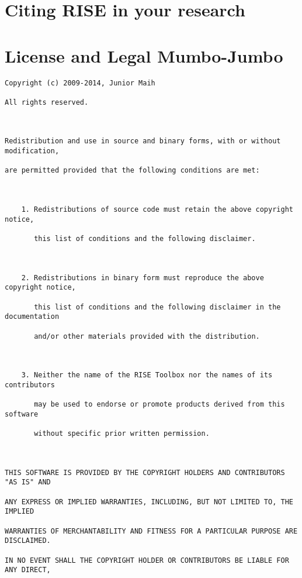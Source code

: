 \documentclass[letterpaper,10pt,english]{sphinxmanual}
\begin{document}
\section{Citing RISE in your research}
\label{intro_folder/citing_rise:citing-rise-in-your-research}\label{intro_folder/citing_rise::doc}

\section{License and Legal Mumbo-Jumbo}
\label{intro_folder/license:license-and-legal-mumbo-jumbo}\label{intro_folder/license::doc}
\begin{Verbatim}[commandchars=\\\{\}]
Copyright (c) 2009-2014, Junior Maih

All rights reserved.



Redistribution and use in source and binary forms, with or without modification,

are permitted provided that the following conditions are met:



	1. Redistributions of source code must retain the above copyright notice,

	   this list of conditions and the following disclaimer.

	

	2. Redistributions in binary form must reproduce the above copyright notice,

	   this list of conditions and the following disclaimer in the documentation

	   and/or other materials provided with the distribution.

	

	3. Neither the name of the RISE Toolbox nor the names of its contributors

	   may be used to endorse or promote products derived from this software

	   without specific prior written permission.



THIS SOFTWARE IS PROVIDED BY THE COPYRIGHT HOLDERS AND CONTRIBUTORS "AS IS" AND

ANY EXPRESS OR IMPLIED WARRANTIES, INCLUDING, BUT NOT LIMITED TO, THE IMPLIED

WARRANTIES OF MERCHANTABILITY AND FITNESS FOR A PARTICULAR PURPOSE ARE DISCLAIMED.

IN NO EVENT SHALL THE COPYRIGHT HOLDER OR CONTRIBUTORS BE LIABLE FOR ANY DIRECT,


\end{Verbatim}
\end{document}
